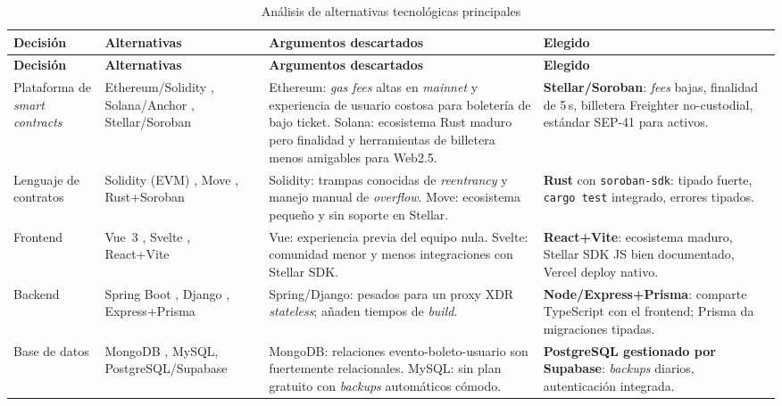 \documentclass[12pt,oneside]{report}
\begin{document}
      \begin{longtable}{@{}p{2.8cm} p{3.4cm} p{4.2cm} p{4.0cm}@{}}
        \caption{Análisis de alternativas tecnológicas principales}
        \label{tab:alt-herramientas}\\
        \toprule
        \textbf{Decisión} & \textbf{Alternativas} & \textbf{Argumentos descartados} & \textbf{Elegido}\\
        \midrule
        \endfirsthead
        \toprule
        \textbf{Decisión} & \textbf{Alternativas} & \textbf{Argumentos descartados} & \textbf{Elegido}\\
        \midrule
        \endhead
        \bottomrule
        \endfoot
        Plataforma de \textit{smart contracts} & Ethereum/Solidity \cite{wood2014,solidity}, Solana/Anchor \cite{solanadocs}, Stellar/Soroban \cite{stellardocs,sorobandocs} & Ethereum: \textit{gas fees} altas en \textit{mainnet} y experiencia de usuario costosa para boletería de bajo ticket. Solana: ecosistema Rust maduro pero finalidad y herramientas de billetera menos amigables para Web2.5. & \textbf{Stellar/Soroban}: \textit{fees} bajas, finalidad de 5\,s, billetera Freighter no-custodial, estándar SEP-41 para activos.\\
        Lenguaje de contratos & Solidity (EVM) \cite{solidity}, Move \cite{movebook}, Rust+Soroban \cite{klabnik2023} & Solidity: trampas conocidas de \textit{reentrancy} y manejo manual de \textit{overflow}. Move: ecosistema pequeño y sin soporte en Stellar. & \textbf{Rust} con \texttt{soroban-sdk}: tipado fuerte, \texttt{cargo test} integrado, errores tipados.\\
        Frontend & Vue~3 \cite{vuedocs}, Svelte \cite{sveltedocs}, React+Vite \cite{reactdocs,vitedocs} & Vue: experiencia previa del equipo nula. Svelte: comunidad menor y menos integraciones con Stellar SDK. & \textbf{React+Vite}: ecosistema maduro, Stellar SDK JS bien documentado, Vercel deploy nativo.\\
        Backend & Spring Boot \cite{springdocs}, Django \cite{djangodocs}, Express+Prisma \cite{expressdocs,prismadocs} & Spring/Django: pesados para un proxy XDR \textit{stateless}; añaden tiempos de \textit{build}. & \textbf{Node/Express+Prisma}: comparte TypeScript con el frontend; Prisma da migraciones tipadas.\\
        Base de datos & MongoDB \cite{mongodocs}, MySQL, PostgreSQL/Supabase \cite{postgresdocs,supabasedocs} & MongoDB: relaciones evento-boleto-usuario son fuertemente relacionales. MySQL: sin plan gratuito con \textit{backups} automáticos cómodo. & \textbf{PostgreSQL gestionado por Supabase}: \textit{backups} diarios, autenticación integrada.\\

\end{longtable}
\end{document}
